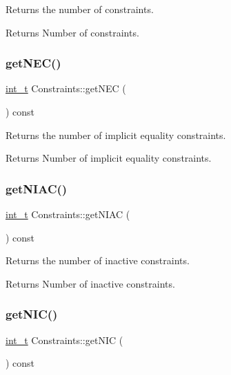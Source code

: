 Returns the number of constraints. \begin{DoxyReturn}{Returns}
Number of constraints. 
\end{DoxyReturn}
\mbox{\label{class_constraints_add16d415a735969692ae1cd9606cb371}} 
\subsubsection{\texorpdfstring{get\+N\+E\+C()}{getNEC()}}
{\footnotesize\ttfamily \hyperlink{_types_8hpp_ab6fd6105e64ed14a0c9281326f05e623}{int\+\_\+t} Constraints\+::get\+N\+EC (\begin{DoxyParamCaption}{ }\end{DoxyParamCaption}) const\hspace{0.3cm}{\ttfamily [inline]}}

Returns the number of implicit equality constraints. \begin{DoxyReturn}{Returns}
Number of implicit equality constraints. 
\end{DoxyReturn}
\mbox{\label{class_constraints_a6839696f0f7796713028ece97ae00fd8}} 
\subsubsection{\texorpdfstring{get\+N\+I\+A\+C()}{getNIAC()}}
{\footnotesize\ttfamily \hyperlink{_types_8hpp_ab6fd6105e64ed14a0c9281326f05e623}{int\+\_\+t} Constraints\+::get\+N\+I\+AC (\begin{DoxyParamCaption}{ }\end{DoxyParamCaption}) const\hspace{0.3cm}{\ttfamily [inline]}}

Returns the number of inactive constraints. \begin{DoxyReturn}{Returns}
Number of inactive constraints. 
\end{DoxyReturn}
\mbox{\label{class_constraints_a9b3c5b78fb7b89cfdca2934522707984}} 
\subsubsection{\texorpdfstring{get\+N\+I\+C()}{getNIC()}}
{\footnotesize\ttfamily \hyperlink{_types_8hpp_ab6fd6105e64ed14a0c9281326f05e623}{int\+\_\+t} Constraints\+::get\+N\+IC (\begin{DoxyParamCaption}{ }\end{DoxyParamCaption}) const\hspace{0.3cm}{\ttfamily [inline]}}

